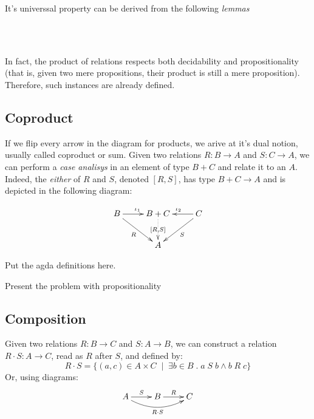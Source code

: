 
It's universsal property can be derived from the following \emph{lemmas}

\\
\\

In fact, the product of relations respects both decidability and propositionality (that is,
given two mere propositions, their product is still a mere proposition). Therefore, such 
instances are already defined.

\subsection{Coproduct}

If we flip every arrow in the diagram for products, we arive at it's dual notion, usually
called coproduct or sum. Given two relations $R : B \rightarrow A$ and $S : C \rightarrow A$,
we can perform a \emph{case analisys} in an element of type $B + C$ and relate it to an $A$.
Indeed, the \emph{either} of $R$ and $S$, denoted $[R , S]$, has type $B + C \rightarrow A$
and is depicted in the following diagram:

\begin{displaymath}
\xymatrix{%
 B \ar[r]^{\iota_1} \ar[dr]_{R} & B + C \ar@{..>}[d]|{[R , S]} & C \ar[l]_{\iota_2} \ar[dl]^{S} \\
   &   A   &
}
\end{displaymath}

\begin{TODO}
  \item Put the agda definitions here.
  \item Present the problem with propositionality
\end{TODO} 


\subsection{Composition}

Given two relations $R : B \rightarrow C$ and $S : A \rightarrow B$, we can construct a
relation $R \cdot S : A \rightarrow C$, read as $R$ after $S$, and defined by:
\[
  R \cdot S = \{ (a, c) \in A \times C\;\mid\; \exists b \in B\;.\; a\;S\;b \wedge b\;R\;c \}
\]
Or, using diagrams:
\begin{displaymath}
  \xymatrix{ A \ar[r]^S \ar@/_1pc/[rr]_{R \cdot S} & B \ar[r]^R & C }
\end{displaymath}

